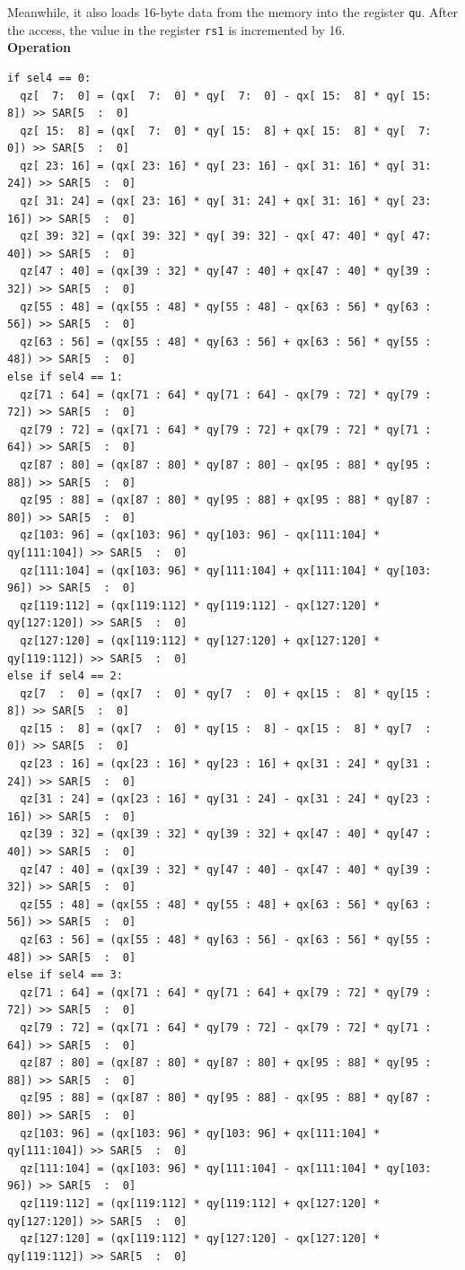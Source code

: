 Meanwhile, it also loads 16-byte data from the memory into the register \lstinline{qu}. After the access, the value in the register \lstinline{rs1} is incremented by 16.\\
\textbf{Operation}\\
\begin{lstlisting}
if sel4 == 0:
  qz[  7:  0] = (qx[  7:  0] * qy[  7:  0] - qx[ 15:  8] * qy[ 15:  8]) >> SAR[5  :  0]
  qz[ 15:  8] = (qx[  7:  0] * qy[ 15:  8] + qx[ 15:  8] * qy[  7:  0]) >> SAR[5  :  0]
  qz[ 23: 16] = (qx[ 23: 16] * qy[ 23: 16] - qx[ 31: 16] * qy[ 31: 24]) >> SAR[5  :  0]
  qz[ 31: 24] = (qx[ 23: 16] * qy[ 31: 24] + qx[ 31: 16] * qy[ 23: 16]) >> SAR[5  :  0]
  qz[ 39: 32] = (qx[ 39: 32] * qy[ 39: 32] - qx[ 47: 40] * qy[ 47: 40]) >> SAR[5  :  0]
  qz[47 : 40] = (qx[39 : 32] * qy[47 : 40] + qx[47 : 40] * qy[39 : 32]) >> SAR[5  :  0]
  qz[55 : 48] = (qx[55 : 48] * qy[55 : 48] - qx[63 : 56] * qy[63 : 56]) >> SAR[5  :  0]
  qz[63 : 56] = (qx[55 : 48] * qy[63 : 56] + qx[63 : 56] * qy[55 : 48]) >> SAR[5  :  0]
else if sel4 == 1:
  qz[71 : 64] = (qx[71 : 64] * qy[71 : 64] - qx[79 : 72] * qy[79 : 72]) >> SAR[5  :  0]
  qz[79 : 72] = (qx[71 : 64] * qy[79 : 72] + qx[79 : 72] * qy[71 : 64]) >> SAR[5  :  0]
  qz[87 : 80] = (qx[87 : 80] * qy[87 : 80] - qx[95 : 88] * qy[95 : 88]) >> SAR[5  :  0]
  qz[95 : 88] = (qx[87 : 80] * qy[95 : 88] + qx[95 : 88] * qy[87 : 80]) >> SAR[5  :  0]
  qz[103: 96] = (qx[103: 96] * qy[103: 96] - qx[111:104] * qy[111:104]) >> SAR[5  :  0]
  qz[111:104] = (qx[103: 96] * qy[111:104] + qx[111:104] * qy[103: 96]) >> SAR[5  :  0]
  qz[119:112] = (qx[119:112] * qy[119:112] - qx[127:120] * qy[127:120]) >> SAR[5  :  0]
  qz[127:120] = (qx[119:112] * qy[127:120] + qx[127:120] * qy[119:112]) >> SAR[5  :  0]
else if sel4 == 2:
  qz[7  :  0] = (qx[7  :  0] * qy[7  :  0] + qx[15 :  8] * qy[15 :  8]) >> SAR[5  :  0]
  qz[15 :  8] = (qx[7  :  0] * qy[15 :  8] - qx[15 :  8] * qy[7  :  0]) >> SAR[5  :  0]
  qz[23 : 16] = (qx[23 : 16] * qy[23 : 16] + qx[31 : 24] * qy[31 : 24]) >> SAR[5  :  0]
  qz[31 : 24] = (qx[23 : 16] * qy[31 : 24] - qx[31 : 24] * qy[23 : 16]) >> SAR[5  :  0]
  qz[39 : 32] = (qx[39 : 32] * qy[39 : 32] + qx[47 : 40] * qy[47 : 40]) >> SAR[5  :  0]
  qz[47 : 40] = (qx[39 : 32] * qy[47 : 40] - qx[47 : 40] * qy[39 : 32]) >> SAR[5  :  0]
  qz[55 : 48] = (qx[55 : 48] * qy[55 : 48] + qx[63 : 56] * qy[63 : 56]) >> SAR[5  :  0]
  qz[63 : 56] = (qx[55 : 48] * qy[63 : 56] - qx[63 : 56] * qy[55 : 48]) >> SAR[5  :  0]
else if sel4 == 3:
  qz[71 : 64] = (qx[71 : 64] * qy[71 : 64] + qx[79 : 72] * qy[79 : 72]) >> SAR[5  :  0]
  qz[79 : 72] = (qx[71 : 64] * qy[79 : 72] - qx[79 : 72] * qy[71 : 64]) >> SAR[5  :  0]
  qz[87 : 80] = (qx[87 : 80] * qy[87 : 80] + qx[95 : 88] * qy[95 : 88]) >> SAR[5  :  0]
  qz[95 : 88] = (qx[87 : 80] * qy[95 : 88] - qx[95 : 88] * qy[87 : 80]) >> SAR[5  :  0]
  qz[103: 96] = (qx[103: 96] * qy[103: 96] + qx[111:104] * qy[111:104]) >> SAR[5  :  0]
  qz[111:104] = (qx[103: 96] * qy[111:104] - qx[111:104] * qy[103: 96]) >> SAR[5  :  0]
  qz[119:112] = (qx[119:112] * qy[119:112] + qx[127:120] * qy[127:120]) >> SAR[5  :  0]
  qz[127:120] = (qx[119:112] * qy[127:120] - qx[127:120] * qy[119:112]) >> SAR[5  :  0]


\end{lstlisting}
